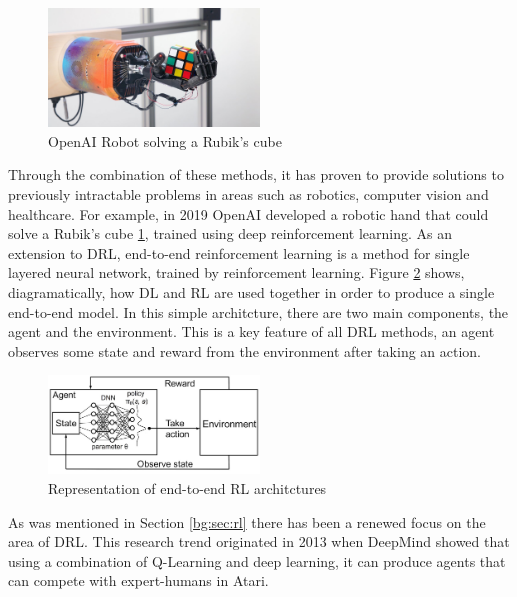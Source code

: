 \begin{figure}[htbp]
	\centering
	\includegraphics[width=0.5\textwidth]{chapters/chapter2/images/openai-robot.jpg}
	\caption{OpenAI Robot solving a Rubik's cube
		\label{fig:openai-robot}
	}
\end{figure}

Through the combination of these methods, it has proven to provide solutions to previously intractable problems \cite{rl-survey} in areas such as robotics, computer vision and healthcare. For example, in 2019 OpenAI developed a robotic hand that could solve a Rubik's cube \ref{fig:openai-robot}, trained using deep reinforcement learning. As an extension to DRL, end-to-end reinforcement learning is a method for single layered neural network, trained by reinforcement learning. Figure \ref{fig:e2e-rl} shows, diagramatically, how DL and RL are used together in order to produce a single end-to-end model. In this simple architcture, there are two main components, the agent and the environment. This is a key feature of all DRL methods, an agent observes some state and reward from the environment after taking an action.

\begin{figure}[htbp]
	\centering
	\includegraphics[width=0.5\textwidth]{chapters/chapter2/images/e2e-rl.jpg}
	\caption{Representation of end-to-end RL architctures
		\label{fig:e2e-rl}
	}
\end{figure}

As was mentioned in Section \ref{bg:sec:rl} there has been a renewed focus on the area of DRL. This research trend originated in 2013 when DeepMind showed that using a combination of Q-Learning and deep learning, it can produce agents that can compete with expert-humans in Atari.

